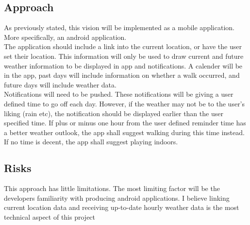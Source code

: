 \documentclass[14pt]{article}
\begin{document}
\subsection{Approach}
As previously stated, this vision will be implemented as a mobile application. More specifically, an android application.\\
The application should include a link into the current location, or have the user set their location. This information will only be used to draw current and future weather information to be displayed in app and notifications. A calender will be in the app, past days will include information on whether a walk occurred, and future days will include weather data. \\
Notifications will need to be pushed. These notifications will be giving a user defined time to go off each day. However, if the weather may not be to the user's liking (rain etc), the notification should be displayed earlier than the user specified time. If plus or minus one hour from the user defined reminder time has a better weather outlook, the app shall suggest walking during this time instead. If no time is decent, the app shall suggest playing indoors.

\subsection{Risks}
This approach has little limitations. The most limiting factor will be the developers familiarity with producing android applications. I believe linking current location data and receiving up-to-date hourly weather data is the most technical aspect of this project



\end{document}
